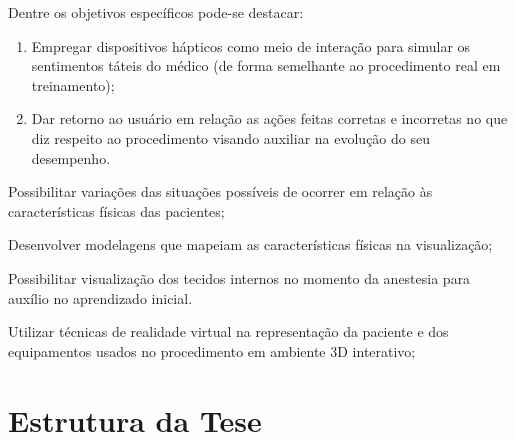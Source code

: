 Dentre os objetivos específicos pode-se destacar:
\begin{enumerate}
\item Empregar dispositivos hápticos como meio de interação para simular os sentimentos táteis do médico (de forma semelhante ao procedimento real em treinamento);
\item Dar retorno ao usuário em relação as ações feitas corretas e incorretas no que diz respeito ao procedimento visando auxiliar na evolução do seu desempenho.
\end{enumerate}
\item Possibilitar variações das situações possíveis de ocorrer em relação às características físicas das pacientes; 
\item Desenvolver modelagens que mapeiam as características físicas na visualização; 
\item Possibilitar visualização dos tecidos internos no momento da anestesia para auxílio no aprendizado inicial. 
\item Utilizar técnicas de realidade virtual na representação da paciente e dos equipamentos usados no procedimento em ambiente 3D interativo;



\section{Estrutura da Tese}
\label{sec:estrutura}

